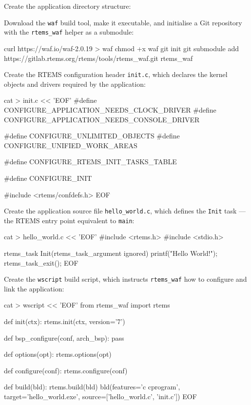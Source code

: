 \documentclass[
	a4paper,
]{CSMakotoTechnicalReport}
\begin{document}
Create the application directory structure:


Download the \texttt{waf} build tool, make it executable, and initialise a Git repository with the \texttt{rtems\_waf} helper as a submodule:

\begin{bashcode}
curl https://waf.io/waf-2.0.19 > waf
chmod +x waf
git init
git submodule add https://gitlab.rtems.org/rtems/tools/rtems_waf.git rtems_waf
\end{bashcode}

Create the RTEMS configuration header \texttt{init.c}, which declares the kernel objects and drivers required by the application:

\begin{bashcode}
cat > init.c << 'EOF'
#define CONFIGURE_APPLICATION_NEEDS_CLOCK_DRIVER
#define CONFIGURE_APPLICATION_NEEDS_CONSOLE_DRIVER

#define CONFIGURE_UNLIMITED_OBJECTS
#define CONFIGURE_UNIFIED_WORK_AREAS

#define CONFIGURE_RTEMS_INIT_TASKS_TABLE

#define CONFIGURE_INIT

#include <rtems/confdefs.h>
EOF
\end{bashcode}

Create the application source file \texttt{hello\_world.c}, which defines the \texttt{Init} task --- the RTEMS entry point equivalent to \texttt{main}:

\begin{bashcode}
cat > hello_world.c << 'EOF'
#include <rtems.h>
#include <stdio.h>

rtems_task Init(rtems_task_argument ignored)
{
    printf("Hello World!\n");
    rtems_task_exit();
}
EOF
\end{bashcode}

Create the \texttt{wscript} build script, which instructs \texttt{rtems\_waf} how to configure and link the application:

\begin{bashcode}
cat > wscript << 'EOF'
from rtems_waf import rtems

def init(ctx):
    rtems.init(ctx, version='7')

def bsp_configure(conf, arch_bsp):
    pass

def options(opt):
    rtems.options(opt)

def configure(conf):
    rtems.configure(conf)

def build(bld):
    rtems.build(bld)
    bld(features='c cprogram',
        target='hello_world.exe',
        source=['hello_world.c', 'init.c'])
EOF
\end{bashcode}
\end{document}
